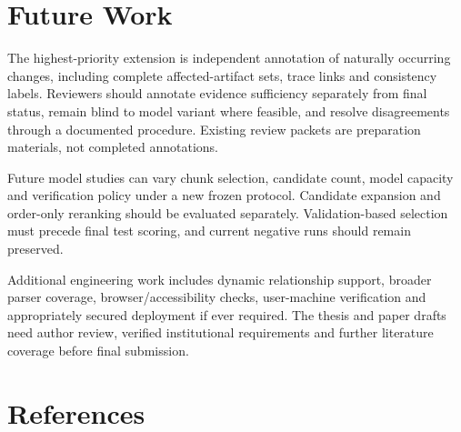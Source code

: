 \documentclass[
  11pt,
  a4paper,
]{report}
\begin{document}
\hypertarget{future-work}{%
\chapter{Future Work}\label{future-work}}

The highest-priority extension is independent annotation of naturally
occurring changes, including complete affected-artifact sets, trace
links and consistency labels. Reviewers should annotate evidence
sufficiency separately from final status, remain blind to model variant
where feasible, and resolve disagreements through a documented
procedure. Existing review packets are preparation materials, not
completed annotations.

Future model studies can vary chunk selection, candidate count, model
capacity and verification policy under a new frozen protocol. Candidate
expansion and order-only reranking should be evaluated separately.
Validation-based selection must precede final test scoring, and current
negative runs should remain preserved.

Additional engineering work includes dynamic relationship support,
broader parser coverage, browser/accessibility checks, user-machine
verification and appropriately secured deployment if ever required. The
thesis and paper drafts need author review, verified institutional
requirements and further literature coverage before final submission.

\hypertarget{references}{%
\chapter{References}\label{references}}
\end{document}
